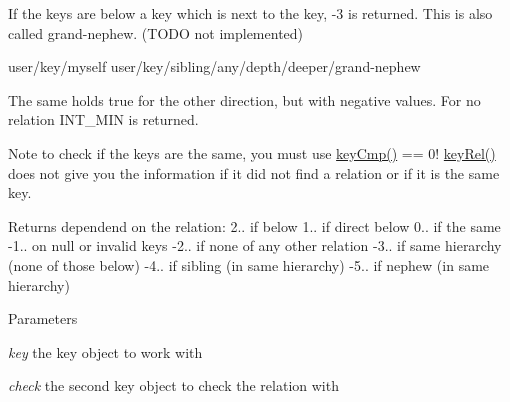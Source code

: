 \begin{DoxyItemize}
\item If the keys are below a key which is next to the key, -\/3 is returned. This is also called grand-\/nephew. (TODO not implemented) \begin{DoxyVerb}
user/key/myself
user/key/sibling/any/depth/deeper/grand-nephew
\end{DoxyVerb}

\end{DoxyItemize}

The same holds true for the other direction, but with negative values. For no relation INT\_\-MIN is returned.

\begin{DoxyNote}{Note}
to check if the keys are the same, you must use \hyperlink{group__keytest_gaf6e66e12fe04d535a5d1c8218ced803e}{keyCmp()} == 0! \hyperlink{group__keytest_ga6bb0f95ac34ce9c42d61bb35a76139d0}{keyRel()} does not give you the information if it did not find a relation or if it is the same key.
\end{DoxyNote}
\begin{DoxyReturn}{Returns}
dependend on the relation: 2.. if below 1.. if direct below 0.. if the same -\/1.. on null or invalid keys -\/2.. if none of any other relation -\/3.. if same hierarchy (none of those below) -\/4.. if sibling (in same hierarchy) -\/5.. if nephew (in same hierarchy)
\end{DoxyReturn}

\begin{DoxyParams}{Parameters}
\item[{\em key}]the key object to work with \item[{\em check}]the second key object to check the relation with \end{DoxyParams}

